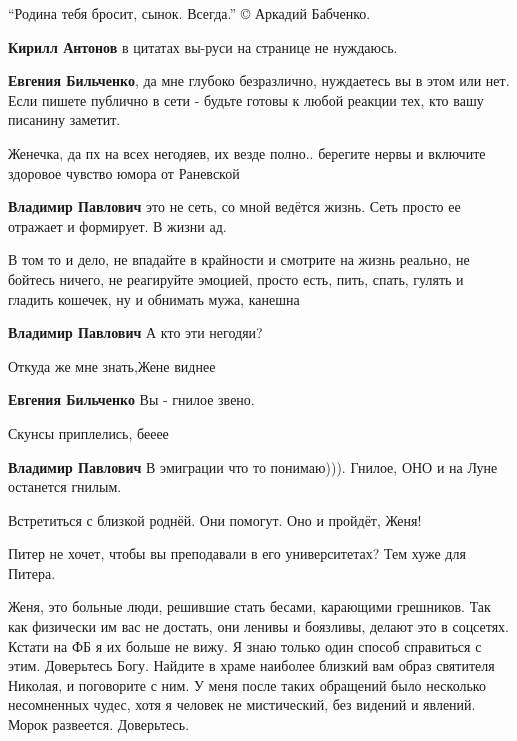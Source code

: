 \begin{itemize}
\enquote{Родина тебя бросит, сынок. Всегда.}
© Аркадий Бабченко.

\begin{itemize} %
\textbf{Кирилл Антонов} в цитатах вы-руси на странице не нуждаюсь.

\textbf{Евгения Бильченко}, да мне глубоко безразлично, нуждаетесь вы в этом или нет. Если пишете публично в сети - будьте готовы к любой реакции тех, кто вашу писанину заметит.
\end{itemize} %


Женечка, да пх на всех негодяев, их везде полно.. берегите нервы и включите
здоровое чувство юмора от Раневской

\begin{itemize} %
\textbf{Владимир Павлович} это не сеть, со мной ведётся жизнь. Сеть просто ее отражает и формирует. В жизни ад.


В том то и дело, не впадайте в крайности и смотрите на жизнь реально, не бойтесь
ничего, не реагируйте эмоцией, просто есть, пить, спать, гулять и гладить
кошечек, ну и обнимать мужа, канешна


\textbf{Владимир Павлович}
А кто эти негодяи?

Откуда же мне знать,Жене виднее

\textbf{Евгения Бильченко}
Вы - гнилое звено.

Скунсы приплелись, бееее

\textbf{Владимир Павлович}
В эмиграции что то понимаю))).
Гнилое, ОНО и на Луне останется гнилым.
\end{itemize} %

Встретиться с близкой роднёй. Они помогут. Оно и пройдёт, Женя!

Питер не хочет, чтобы вы преподавали в его университетах? Тем хуже для Питера.


Женя, это больные люди, решившие стать бесами, карающими грешников. Так как
физически им вас не достать, они ленивы и боязливы, делают это в соцсетях.
Кстати на ФБ я их больше не вижу. Я знаю только один способ справиться с этим.
Доверьтесь Богу. Найдите в храме наиболее близкий вам образ святителя Николая,
и поговорите с ним. У меня после таких обращений было несколько несомненных
чудес, хотя я человек не мистический, без видений и явлений. Морок развеется.
Доверьтесь.


\end{itemize}
